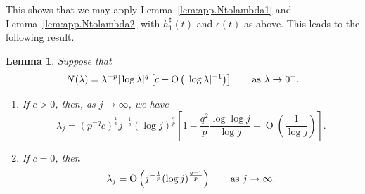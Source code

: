 \documentclass[10pt, a4paper]{amsart}
\newcommand{\op}{\operatorname}
\numberwithin{equation}{section}
\newtheorem{lemma}[theorem]{Lemma}
\theoremstyle{definition}
\theoremstyle{remark}
\begin{document}
This shows that we may apply Lemma~\ref{lem:app.Ntolambda1} and Lemma~\ref{lem:app.Ntolambda2} with $h_1^\sharp(t)$ and $\epsilon(t)$ as above. This leads to the following result.

\begin{lemma}\label{lem:app.example-tplogq}
 Suppose that
 \begin{equation*}
 N(\lambda)= \lambda^{-p}|\log \lambda|^q \left[c +\op{O}\left(|\log \lambda|^{-1}\right)\right] \qquad \textup{as}\ \lambda\rightarrow 0^+.
\end{equation*}
\begin{enumerate}
 \item[(i)] If $c>0$, then, as $j\rightarrow \infty$, we have
 \begin{equation*}
 \lambda_j = \left(p^{-q}c\right)^{\frac 1p} j^{-\frac1p} (\log j )^{\frac{q}{p}} \left[ 1- \frac{q^2}{p} \frac{\log \log j}{\log j} + \op{O}\left(\frac{1}{\log j}\right) \right].
\end{equation*}

\item[(ii)] If $c=0$, then
\begin{equation*}
  \lambda_j = \op{O}\left(j^{-\frac1p}(\log j)^{\frac{q-1}{p}}\right) \qquad \textup{as}\ j\rightarrow \infty.
\end{equation*}
\end{enumerate}
\end{lemma}
\end{document}
